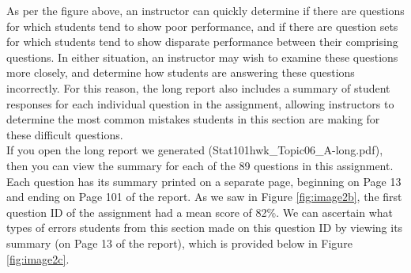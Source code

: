 \documentclass{article}\usepackage[]{graphicx}\usepackage[]{color}
\numberwithin{equation}{section} %
\begin{document}
\begin{center}
\captionsetup{width=\textwidth}
\label{fig:image2b}
\end{center}

As per the figure above, an instructor can quickly determine if there are questions for which students tend to show poor performance, and if there are question sets for which students tend to show disparate performance between their comprising questions. In either situation, an instructor may wish to examine these questions more closely, and determine how students are answering these questions incorrectly. For this reason, the long report also includes a summary of student responses for each individual question in the assignment, allowing instructors to determine the most common mistakes students in this section are making for these difficult questions.\\

If you open the long report we generated ({Stat101hwk\_Topic06\_A-long.pdf}), then you can view the summary for each of the 89 questions in this assignment. Each question has its summary printed on a separate page, beginning on Page 13 and ending on Page 101 of the report. As we saw in Figure \ref{fig:image2b}, the first question ID of the assignment had a mean score of 82\%. We can ascertain what types of errors students from this section made on this question ID by viewing its summary (on Page 13 of the report), which is provided below in Figure \ref{fig:image2c}. 
\end{document}
